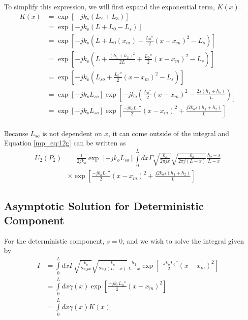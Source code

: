 \noindent To simplify this expression, we will first expand the exponential term, $K(x)$.
\begin{equation}
\begin{aligned}
K(x)&= \exp\left[-jk_o\left( L_2 + L_3\right) \right] \\
&= \exp\left[-jk_o\left( L+L_0-L_s\right) \right]\\
&= \exp\left[-jk_o\left( L+L_0(x_m) + \frac{L_0''}{2}(x-x_m)^2-L_s\right) \right]\\
&= \exp\left[-jk_o\left( L+\frac{(h_1+h_2)^2}{2L} + \frac{L_0''}{2}(x-x_m)^2-L_s\right)\right]\\
&=\exp\left[-jk_o\left(L_{so}+\frac{L_0''}{2}(x-x_m)^2-L_s\right)\right]\\
&=\exp\left[-jk_oL_{so}\right]\exp\left[-jk_o\left(\frac{L_0''}{2}(x-x_m)^2-\frac{2s(h_1+h_2)}{L}\right)\right]\\
&=\exp\left[-jk_oL_{so}\right]\exp\left[\frac{-jk_oL_0''}{2}(x-x_m)^2+\frac{j2k_os(h_1+h_2)}{L}\right]\\
\label{mp_eq:12i}
\end{aligned}
\end{equation}
\renewcommand{\baselinestretch}{2} \small\normalsize

Because $L_{so}$ is not dependent on $x$, it can come outside of the integral and Equation \ref{mp_eq:12g} can be written as
\begin{equation}
\begin{aligned}
U_2(P_2)&= \frac{1}{2jk_o}\exp\left[-jk_oL_{so}\right]\int\limits_{0}^{L}dx\Gamma \sqrt{\frac{k_o}{2\pi jx}}\sqrt{\frac{k_o}{2\pi j (L-x)}}\frac{h_2-s}{L-x}\\ &\times\exp\left[\frac{-jk_oL_0''}{2}(x-x_m)^2+\frac{j2k_os(h_1+h_2)}{L}\right]
\label{mp_eq:21}
\end{aligned}
\end{equation}
\renewcommand{\baselinestretch}{2} \small\normalsize

\subsection{Asymptotic Solution for Deterministic Component}
For the deterministic component, $s = 0$, and we wish to solve the integral given by
\begin{equation}
\begin{aligned}
I &= \int\limits_{0}^{L}dx\Gamma \sqrt{\frac{k_o}{2\pi jx}}\sqrt{\frac{k_o}{2\pi j (L-x)}}\frac{h_2}{L-x}\exp\left[\frac{-jk_oL_0''}{2}(x-x_m)^2\right] \\
&= \int\limits_{0}^{L}dx\gamma(x)\exp\left[\frac{-jk_oL_0''}{2}(x-x_m)^2\right] \\
&= \int\limits_{0}^{L}dx\gamma(x)K(x) 
\end{aligned}
\label{mp_eq:22}
\end{equation}

